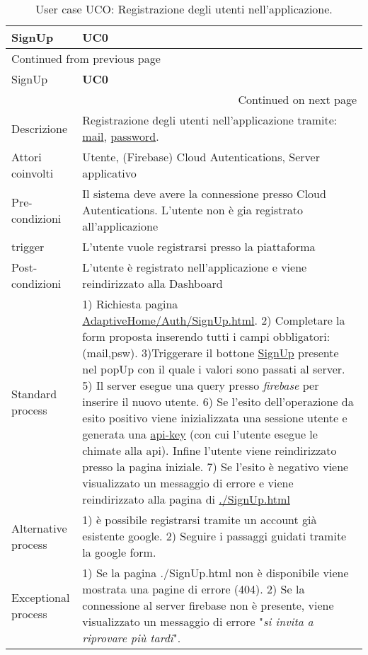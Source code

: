 \documentclass[onecolumn,a4paper]{article}
\begin{document}
\begin{longtable}{|l|p{9.7cm}|}
\caption{User case UCO: Registrazione degli utenti nell'applicazione.}
\\
\cellcolor{grey!15}SignUp & \cellcolor{grey!15} \textbf{UC0}\\
\hline
\endfirsthead
\multicolumn{2}{l}{Continued from previous page} \\
\hline

\cellcolor{grey!15}SignUp & \cellcolor{grey!15} \textbf{UC0} \\

\hline
\endhead
\hline\multicolumn{2}{r}{Continued on next page} \\
\endfoot
\endlastfoot
\hline
Descrizione & Registrazione degli utenti nell'applicazione tramite: \uline{mail}, \uline{password}.\\
\hline
Attori coinvolti & Utente, (Firebase) Cloud Autentications, Server applicativo\\
\hline
Pre-condizioni & Il sistema deve avere la connessione presso Cloud Autentications. L'utente non è gia registrato all'applicazione\\
\hline
trigger & L'utente vuole registrarsi presso la piattaforma\\
\hline
Post-condizioni & L'utente è registrato nell'applicazione e viene reindirizzato alla Dashboard\\
\hline
Standard process & 1) Richiesta pagina \uline{AdaptiveHome/Auth/SignUp.html}. 2) Completare la form proposta inserendo tutti i campi obbligatori: (mail,psw). 3)Triggerare il bottone \uline{SignUp} presente nel popUp con il quale i valori sono passati al server. 5) Il server esegue una query presso \emph{firebase} per inserire il nuovo utente. 6) Se l'esito dell'operazione da esito positivo viene inizializzata una sessione utente e generata una \uline{api-key} (con cui l'utente esegue le chimate alla api). Infine l'utente viene reindirizzato presso la pagina iniziale. 7) Se l'esito è negativo viene visualizzato un messaggio di errore e viene reindirizzato alla pagina di \uline{./SignUp.html}\\
\hline
Alternative process & 1) è possibile registrarsi tramite un account già esistente google. 2) Seguire i passaggi guidati tramite la google form.\\
\hline
Exceptional process & 1) Se la pagina ./SignUp.html non è disponibile viene mostrata una pagine di errore (404). 2) Se la connessione al server firebase non è presente, viene visualizzato un messaggio di errore "\emph{si invita a riprovare più tardi}".\\
\hline
\end{longtable}
\end{document}
